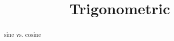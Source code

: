 \documentclass{ximera}
\title{Trigonometric}
\begin{document}
\begin{abstract}
sine vs. cosine
\end{abstract}
\maketitle
\end{document}
